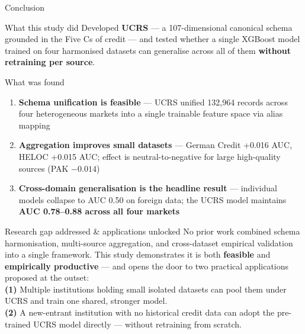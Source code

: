\documentclass[9pt,aspectratio=169]{beamer}
\begin{document}
\begin{frame}{Conclusion}
\vspace{-2pt}
\begin{block}{What this study did}
  \footnotesize
  Developed \textbf{UCRS} — a 107-dimensional canonical schema grounded in the Five Cs of
  credit — and tested whether a single XGBoost model trained on four harmonised datasets
  can generalise across all of them \textbf{without retraining per source}.
\end{block}
\vspace{5pt}
\begin{block}{What was found}
  \footnotesize
  \begin{enumerate}\setlength\itemsep{4pt}
    \item \textbf{Schema unification is feasible} — UCRS unified 132,964 records across four
          heterogeneous markets into a single trainable feature space via alias mapping

    \item \textbf{Aggregation improves small datasets} — German Credit +0.016 AUC,
          HELOC +0.015 AUC; effect is neutral-to-negative for large high-quality sources
          (PAK $-0.014$)

    \item \textbf{Cross-domain generalisation is the headline result} — individual models
          collapse to AUC 0.50 on foreign data; the UCRS model maintains
          \textbf{AUC 0.78--0.88 across all four markets}
  \end{enumerate}
\end{block}
\vspace{5pt}
\begin{alertblock}{Research gap addressed \& applications unlocked}
  \footnotesize
  No prior work combined schema harmonisation, multi-source aggregation, and cross-dataset
  empirical validation into a single framework. This study demonstrates it is both
  \textbf{feasible} and \textbf{empirically productive} — and opens the door to two
  practical applications proposed at the outset:\\[4pt]
  \textbf{(1)} Multiple institutions holding small isolated datasets can pool them under
  UCRS and train one shared, stronger model.\\[3pt]
  \textbf{(2)} A new-entrant institution with no historical credit data can adopt the
  pre-trained UCRS model directly — without retraining from scratch.
\end{alertblock}
\end{frame}
\end{document}
